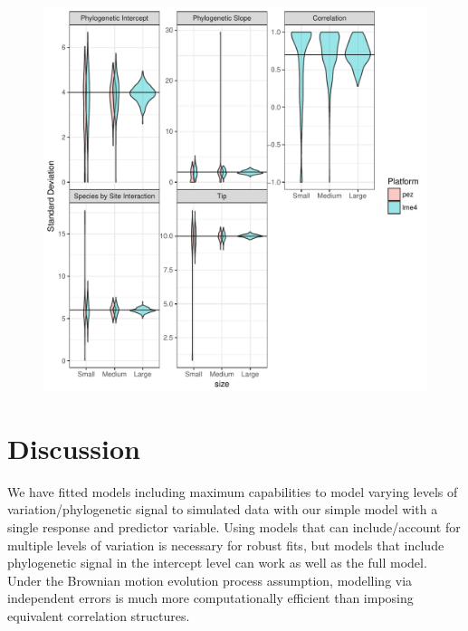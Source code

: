 \begin{center}
\begin{figure}[h]
\includegraphics[scale=0.8,page=2]{./csplot.pdf}
\end{figure}
\end{center}



\newpage

\section{Discussion}

We have fitted models including maximum capabilities to model varying levels of variation/phylogenetic signal to simulated data with our simple model with a single response and predictor variable.
Using models that can include/account for multiple levels of variation is necessary for robust fits, but models that include phylogenetic signal in the intercept level can work as well as the full model.
Under the Brownian motion evolution process assumption, modelling via independent errors is much more computationally efficient than imposing equivalent correlation structures.

